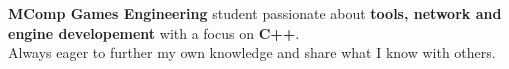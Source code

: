 \vspace*{-5mm}
\noindent
\begin{center}
  \textbf{MComp Games Engineering} student passionate about \textbf{tools, network and engine developement} with a focus on \textbf{C++}.
  \\
  Always eager to further my own knowledge and share what I know with others.
\end{center}
